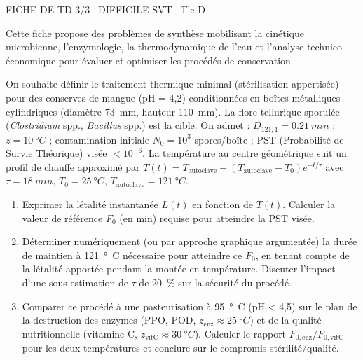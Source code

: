 \documentclass[11pt]{article}
\begin{document}
\begin{tcolorbox}[enhanced,colback=popink,colframe=popink,arc=10pt,boxrule=0pt,left=12pt,right=12pt,top=9pt,bottom=9pt]
{\color{white}\popxbold\small FICHE DE TD 3/3 \textbullet\ DIFFICILE \hfill SVT \textbullet\ Tle D\par}
\end{tcolorbox}
\vspace{4pt}
Cette fiche propose des problèmes de synthèse mobilisant la cinétique microbienne, l'enzymologie, la thermodynamique de l'eau et l'analyse technico-économique pour évaluer et optimiser les procédés de conservation.

\begin{exercice}
On souhaite définir le traitement thermique minimal (stérilisation appertisée) pour des conserves de mangue (pH = 4,2) conditionnées en boîtes métalliques cylindriques (diamètre \SI{73}{mm}, hauteur \SI{110}{mm}). La flore tellurique sporulée (\textit{Clostridium} spp., \textit{Bacillus} spp.) est la cible. On admet : $D_{121,1} = \SI{0,21}{min}$ ; $z = \SI{10}{°C}$ ; contamination initiale $N_0 = 10^3$ spores/boîte ; PST (Probabilité de Survie Théorique) visée $< 10^{-6}$. La température au centre géométrique suit un profil de chauffe approximé par $T(t) = T_{\text{autoclave}} - (T_{\text{autoclave}} - T_0) e^{-t/\tau}$ avec $\tau = \SI{18}{min}$, $T_0 = \SI{25}{°C}$, $T_{\text{autoclave}} = \SI{121}{°C}$.
\begin{enumerate}
    \item Exprimer la létalité instantanée $L(t)$ en fonction de $T(t)$. Calculer la valeur de référence $F_0$ (en min) requise pour atteindre la PST visée.
    \item Déterminer numériquement (ou par approche graphique argumentée) la durée de maintien à \SI{121}{°C} nécessaire pour atteindre ce $F_0$, en tenant compte de la létalité apportée pendant la montée en température. Discuter l'impact d'une sous-estimation de $\tau$ de \SI{20}{\%} sur la sécurité du procédé.
    \item Comparer ce procédé à une pasteurisation à \SI{95}{°C} (pH < 4,5) sur le plan de la destruction des enzymes (PPO, POD, $z_{\text{enz}} \approx \SI{25}{°C}$) et de la qualité nutritionnelle (vitamine C, $z_{\text{vitC}} \approx \SI{30}{°C}$). Calculer le rapport $F_{0,\text{enz}}/F_{0,\text{vitC}}$ pour les deux températures et conclure sur le compromis stérilité/qualité.
\end{enumerate}
\end{exercice}
\end{document}
